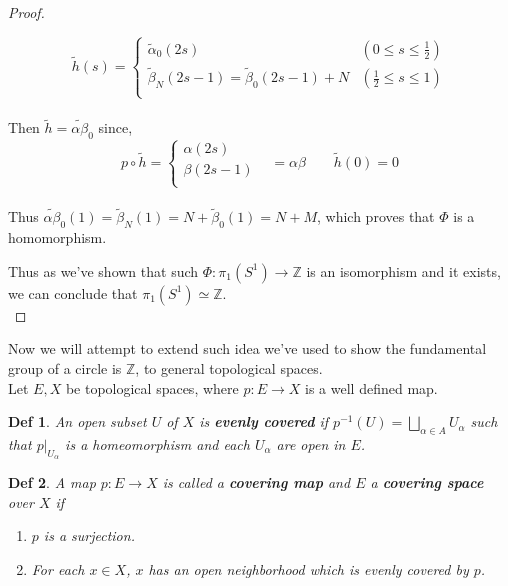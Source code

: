 \documentclass[paper=a4, fontsize=11pt]{scrartcl}
\newtheorem{definition}{Def}
\begin{document}
\begin{proof}
\begin{enumerate}
	\begin{equation}\nonumber
	\tilde{h}(s)=
		\begin{cases}
		\tilde{\alpha}_0 (2s) & (0\leq s \leq \frac{1}{2})\\
		\tilde{\beta}_N (2s-1) = \tilde{\beta}_0(2s-1) + N & (\frac{1}{2} \leq s \leq 1) \\
		\end{cases}
	\end{equation}\\
	
	Then $\tilde{h} = \tilde{\alpha\beta}_0$ since,\\
	
	\begin{equation}\nonumber
		p \circ \tilde{h} =
		\begin{cases}
		\alpha(2s) & \\
		\beta(2s-1) & \\
		\end{cases}
		 = \alpha\beta \qquad \tilde{h}(0) = 0
	\end{equation}\\
	
	Thus $\tilde{\alpha\beta}_0(1) = \tilde{\beta}_N(1) = N + \tilde{\beta}_0(1)=N+M$, which proves that $\Phi$ is a homomorphism.
\end{enumerate}

Thus as we've shown that such $\Phi : \pi_1(S^1) \to \mathbb{Z}$ is an isomorphism and it exists, we can conclude that $\pi_1(S^1) \simeq \mathbb{Z}$.\\ 
\end{proof}

Now we will attempt to extend such idea we've used to show the fundamental group of a circle is $\mathbb{Z}$, to general topological spaces. \\

Let $E,X$ be topological spaces, where $p:E\to X$ is a well defined map.\\

\begin{definition}
	An open subset $U$ of $X$ is \textbf{evenly covered} if $p^{-1}(U)=\bigsqcup\limits_{\alpha \in A} U_\alpha$ such that $p|_{U_\alpha}$ is a homeomorphism and each $U_\alpha$ are open in $E$.
\end{definition}

\vspace{0.15in}

\begin{definition}
	A map $p:E\to X$ is called a \textbf{covering map} and $E$ a \textbf{covering space} over $X$ if 
	\begin{enumerate}
		\item  $p$ is a surjection.
		\item For each $x \in X$, $x$ has an open neighborhood which is evenly covered by $p$.
	\end{enumerate}
\end{definition}
\end{document}

